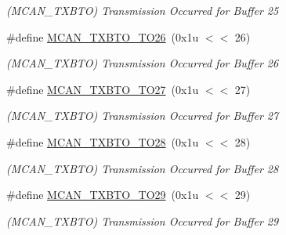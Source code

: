 \begin{DoxyCompactItemize}
\begin{DoxyCompactList}\small\item\em (M\+C\+A\+N\+\_\+\+T\+X\+B\+TO) Transmission Occurred for Buffer 25 \end{DoxyCompactList}\item 
\mbox{\label{group__SAMV71__MCAN_ga3e80f17f095ceb6b28c246571080fd37}} 
\#define \mbox{\hyperlink{group__SAMV71__MCAN_ga3e80f17f095ceb6b28c246571080fd37}{M\+C\+A\+N\+\_\+\+T\+X\+B\+T\+O\+\_\+\+T\+O26}}~(0x1u $<$$<$ 26)
\begin{DoxyCompactList}\small\item\em (M\+C\+A\+N\+\_\+\+T\+X\+B\+TO) Transmission Occurred for Buffer 26 \end{DoxyCompactList}\item 
\mbox{\label{group__SAMV71__MCAN_gaa7fd29b4879d9f0f6195a5a6b4e60187}} 
\#define \mbox{\hyperlink{group__SAMV71__MCAN_gaa7fd29b4879d9f0f6195a5a6b4e60187}{M\+C\+A\+N\+\_\+\+T\+X\+B\+T\+O\+\_\+\+T\+O27}}~(0x1u $<$$<$ 27)
\begin{DoxyCompactList}\small\item\em (M\+C\+A\+N\+\_\+\+T\+X\+B\+TO) Transmission Occurred for Buffer 27 \end{DoxyCompactList}\item 
\mbox{\label{group__SAMV71__MCAN_ga3d4d03d989bb948fe5e28ecc225a08b4}} 
\#define \mbox{\hyperlink{group__SAMV71__MCAN_ga3d4d03d989bb948fe5e28ecc225a08b4}{M\+C\+A\+N\+\_\+\+T\+X\+B\+T\+O\+\_\+\+T\+O28}}~(0x1u $<$$<$ 28)
\begin{DoxyCompactList}\small\item\em (M\+C\+A\+N\+\_\+\+T\+X\+B\+TO) Transmission Occurred for Buffer 28 \end{DoxyCompactList}\item 
\mbox{\label{group__SAMV71__MCAN_ga52b8bcab87c85c41cb778bf0e1c05b52}} 
\#define \mbox{\hyperlink{group__SAMV71__MCAN_ga52b8bcab87c85c41cb778bf0e1c05b52}{M\+C\+A\+N\+\_\+\+T\+X\+B\+T\+O\+\_\+\+T\+O29}}~(0x1u $<$$<$ 29)
\begin{DoxyCompactList}\small\item\em (M\+C\+A\+N\+\_\+\+T\+X\+B\+TO) Transmission Occurred for Buffer 29 \end{DoxyCompactList}\item 

\end{DoxyCompactItemize}
